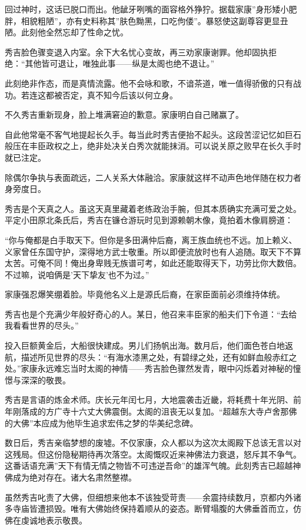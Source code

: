 \documentclass[
]{article}
\begin{document}
回过神时，这话已脱口而出。他龇牙咧嘴的面容格外狰狞。据载家康''身形矮小肥胖，相貌粗陋''，亦有史料称其''肤色黝黑，口吃佝偻''。暴怒使这副尊容更显丑陋。此刻他全然忘却了性命之忧。

秀吉脸色骤变退入内室。余下大名忧心变故，再三劝家康谢罪。他却固执拒绝：``其他皆可退让，唯独此事------纵是太阁也绝不退让。''

此刻绝非作态，而是真情流露。他不会咏和歌，不谙茶道，唯一值得骄傲的只有战功。若连这都被否定，真不知今后该以何立身。

不久秀吉重新现身，脸上堆满窘迫的歉意。家康明白自己赌赢了。

自此他常毫不客气地提起长久手。每当此时秀吉便抬不起头。这段苦涩记忆如巨石般压在丰臣政权之上，绝非处决关白秀次就能抹消。可以说关原之败早在长久手时就已注定。

除偶尔争执与表面疏远，二人关系大体融洽。家康就这样不动声色地伴随在权力者身旁度日。

秀吉是个天真之人。虽这天真里藏着老练政治手腕，但其本质确实充满可爱之处。平定小田原北条氏后，秀吉在镰仓游玩时见到源赖朝木像，竟拍着木像肩膀道：

``你与俺都是白手取天下。但你是多田满仲后裔，离王族血统也不远。加上赖义、义家曾任东国守护，深得地方武士敬重。所以即便流放时也有人追随。取天下不算太苦。可俺不同！俺出身卑贱无族谱可考，如此还能取得天下，功劳比你大数倍。不过嘛，说咱俩是'天下挚友'也不为过。''

家康强忍爆笑绷着脸。毕竟他名义上是源氏后裔，在家臣面前必须维持体统。

秀吉也是个充满少年般好奇心的人。某日，他召来丰臣家的船夫们下令道：``去给我看看世界的尽头。''

投入巨额黄金后，大船很快建成。男儿们扬帆出海。数月后，他们面色苍白地返航，描述所见世界的尽头：``有海水漆黑之处，有碧绿之处，还有如鲜血般赤红之处。''家康永远难忘当时太阁的神情------秀吉脸色骤然发青，眼中闪烁着对神秘的憧憬与深深的敬畏。

秀吉是言语的炼金术师。庆长元年闰七月，大地震袭击近畿，将耗费十年光阴、前年刚落成的方广寺十六丈大佛震倒。太阁的沮丧无以复加。``超越东大寺卢舍那佛的大佛''本应成为他毕生追求宏伟之梦的华美纪念碑。

数日后，秀吉亲临梦想的废墟。不仅家康，众人都以为这次太阁殿下总该无言以对这残局。但这份隐秘期待再次落空。太阁慨叹近来神佛法力衰退，怒斥其不争气。这番话语充满''天下有情无情之物皆不可违逆吾命''的雄浑气魄。此刻秀吉已超越神佛成为绝对存在。诸大名肃然整襟。

虽然秀吉叱责了大佛，但细想来他本不该独受苛责------余震持续数月，京都内外诸多寺庙皆遭损毁。唯有大佛始终保持着顺从的姿态。断臂塌腹的大佛垂首而立，仿佛在虔诚地表示敬畏。
\end{document}
